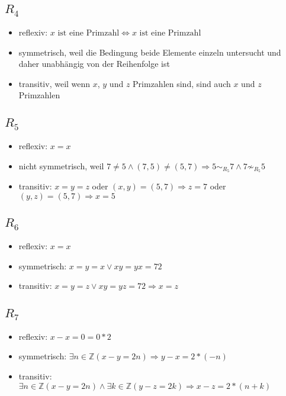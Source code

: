 \documentclass[a4paper,10pt]{article}
\begin{document}
\subsection*{$R_4$}

\begin{itemize}
 \item reflexiv: $x \text{ ist eine Primzahl} \Leftrightarrow x \text{ ist eine Primzahl}$
 \item symmetrisch, weil die Bedingung beide Elemente einzeln untersucht und daher unabhängig von der Reihenfolge ist
 \item transitiv, weil wenn $x$, $y$ und $z$ Primzahlen sind, sind auch $x$ und $z$ Primzahlen
\end{itemize}

\subsection*{$R_5$}

\begin{itemize}
 \item reflexiv: $x = x$
 \item nicht symmetrisch, weil $7 \ne 5 \land (7,5) \ne (5,7) \Rightarrow 5 \sim_{R_5} 7 \land 7 \not\sim_{R_5} 5$
 \item transitiv: $x = y = z$ oder $(x,y) = (5,7) \Rightarrow z = 7$ oder $(y,z) = (5,7) \Rightarrow x = 5$
\end{itemize}

\subsection*{$R_6$}

\begin{itemize}
 \item reflexiv: $x = x$
 \item symmetrisch: $x = y = x \lor xy = yx = 72$
 \item transitiv: $x = y = z \lor xy = yz = 72 \Rightarrow x = z$
\end{itemize}

\subsection*{$R_7$}

\begin{itemize}
 \item reflexiv: $x - x = 0 = 0 * 2$
 \item symmetrisch: $\exists n \in \mathbb{Z} (x - y = 2n) \Rightarrow y - x = 2 * (-n)$
 \item transitiv: $\exists n \in \mathbb{Z} (x - y = 2n) \land \exists k \in \mathbb{Z} (y - z = 2k) \Rightarrow x - z = 2 * (n + k)$
\end{itemize}
\end{document}
